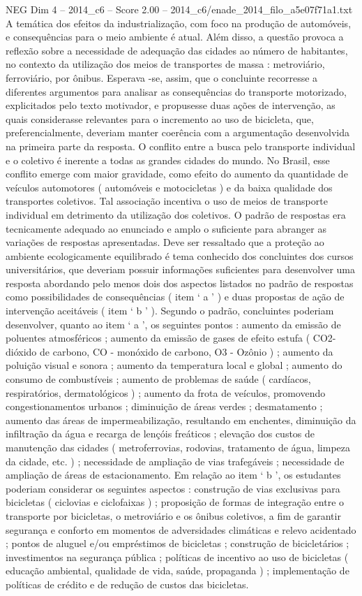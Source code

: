 \begin{textsample}{NEG Dim 4 – 2014\_c6 – Score 2.00 – 2014\_c6/enade\_2014\_filo\_a5e07f71a1.txt}
A temática dos efeitos da industrialização, com foco na produção de automóveis, e consequências para o meio ambiente é atual.
Além disso, a questão provoca a reflexão sobre a necessidade de adequação das cidades ao número de habitantes, no contexto da utilização dos meios de transportes de massa : metroviário, ferroviário, por ônibus.
Esperava -se, assim, que o concluinte recorresse a diferentes argumentos para analisar as consequências do transporte motorizado, explicitados pelo texto motivador, e propusesse duas ações de intervenção, as quais considerasse relevantes para o incremento ao uso de bicicleta, que, preferencialmente, deveriam manter coerência com a argumentação desenvolvida na primeira parte da resposta.
O conflito entre a busca pelo transporte individual e o coletivo é inerente a todas as grandes cidades do mundo.
No Brasil, esse conflito emerge com maior gravidade, como efeito do aumento da quantidade de veículos automotores ( automóveis e motocicletas ) e da baixa qualidade dos transportes coletivos.
Tal associação incentiva o uso de meios de transporte individual em detrimento da utilização dos coletivos.
O padrão de respostas era tecnicamente adequado ao enunciado e amplo o suficiente para abranger as variações de respostas apresentadas.
Deve ser ressaltado que a proteção ao ambiente ecologicamente equilibrado é tema conhecido dos concluintes dos cursos universitários, que deveriam possuir informações suficientes para desenvolver uma resposta abordando pelo menos dois dos aspectos listados no padrão de respostas como possibilidades de consequências ( item ‘ a ’ ) e duas propostas de ação de intervenção aceitáveis ( item ‘ b ’ ).
Segundo o padrão, concluintes poderiam desenvolver, quanto ao item ‘ a ’, os seguintes pontos : aumento da emissão de poluentes atmosféricos ; aumento da emissão de gases de efeito estufa ( CO2- dióxido de carbono, CO - monóxido de carbono, O3 - Ozônio ) ; aumento da poluição visual e sonora ; aumento da temperatura local e global ; aumento do consumo de combustíveis ; aumento de problemas de saúde ( cardíacos, respiratórios, dermatológicos ) ; aumento da frota de veículos, promovendo congestionamentos urbanos ; diminuição de áreas verdes ; desmatamento ; aumento das áreas de impermeabilização, resultando em enchentes, diminuição da infiltração da água e recarga de lençóis freáticos ; elevação dos custos de manutenção das cidades ( metroferrovias, rodovias, tratamento de água, limpeza da cidade, etc. ) ; necessidade de ampliação de vias trafegáveis ; necessidade de ampliação de áreas de estacionamento.
Em relação ao item ‘ b ’, os estudantes poderiam considerar os seguintes aspectos : construção de vias exclusivas para bicicletas ( ciclovias e ciclofaixas ) ; proposição de formas de integração entre o transporte por bicicletas, o metroviário e os ônibus coletivos, a fim de garantir segurança e conforto em momentos de adversidades climáticas e relevo acidentado ; pontos de aluguel e/ou empréstimos de bicicletas ; construção de bicicletários ; investimentos na segurança pública ; políticas de incentivo ao uso de bicicletas ( educação ambiental, qualidade de vida, saúde, propaganda ) ; implementação de políticas de crédito e de redução de custos das bicicletas.

\end{textsample}
